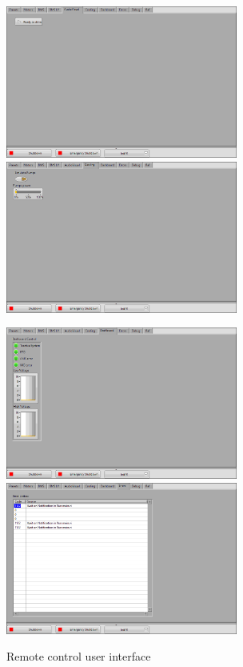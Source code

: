 \begin{figure}[h]\ContinuedFloat
    \centering
        \includegraphics[height=5cm]{figures/Run_mainp4.png}
        \includegraphics[height=5cm]{figures/Run_mainp5.png}
\end{figure}
\begin{figure}[h]\ContinuedFloat
    \centering
        \includegraphics[height=5cm]{figures/Run_mainp6.png}
        \includegraphics[height=5cm]{figures/Run_mainp7.png}
        \caption{Remote control user interface}
\end{figure}

